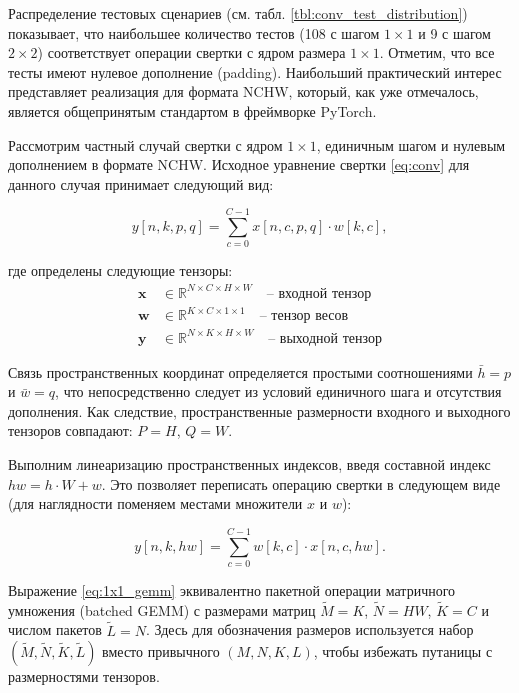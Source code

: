 Распределение тестовых сценариев (см. табл. \ref{tbl:conv_test_distribution}) показывает, что наибольшее количество тестов (108 с шагом $1 \times 1$ и 9 с шагом
$2 \times 2$) соответствует операции свертки с ядром размера $1 \times 1$. Отметим, что все тесты имеют нулевое дополнение (padding).
Наибольший практический интерес представляет реализация для формата NCHW, который, как уже отмечалось, является общепринятым стандартом в фреймворке PyTorch.

Рассмотрим частный случай свертки с ядром $1\times1$, единичным шагом и нулевым дополнением в формате NCHW. Исходное уравнение свертки \eqref{eq:conv} для
данного случая принимает следующий вид:

\begin{equation}
y[n, k, p, q] = \sum_{c=0}^{C-1} x[n, c, p, q] \cdot w[k, c],
\label{eq:1x1_conv}
\end{equation}

где определены следующие тензоры:
\begin{align*}
\mathbf{x} &\in \mathbb{R}^{N \times C \times H \times W} \quad \text{-- входной тензор} \\
\mathbf{w} &\in \mathbb{R}^{K \times C \times 1 \times 1} \quad \text{-- тензор весов} \\
\mathbf{y} &\in \mathbb{R}^{N \times K \times H \times W} \quad \text{-- выходной тензор}
\end{align*}

Связь пространственных координат определяется простыми соотношениями $\bar{h}=p$ и $\bar{w}=q$, что непосредственно следует из условий единичного шага и
отсутствия дополнения. Как следствие, пространственные размерности входного и выходного тензоров совпадают: $P=H$, $Q=W$.

Выполним линеаризацию пространственных индексов, введя составной индекс $hw = h \cdot W + w$. Это позволяет переписать операцию свертки в следующем
виде (для наглядности поменяем местами множители $x$ и $w$):

\begin{equation}
y[n, k, hw] = \sum_{c=0}^{C-1} w[k, c] \cdot x[n, c, hw].
\label{eq:1x1_gemm}
\end{equation}

Выражение \eqref{eq:1x1_gemm} эквивалентно пакетной операции матричного умножения (batched GEMM) с размерами матриц $\tilde{M} = K$, $\tilde{N} = H W$,
$\tilde{K} = C$ и числом пакетов $\tilde{L} = N$. Здесь для обозначения размеров используется набор $(\tilde{M}, \tilde{N}, \tilde{K}, \tilde{L})$
вместо привычного $(M, N, K, L)$, чтобы избежать путаницы с размерностями тензоров.

